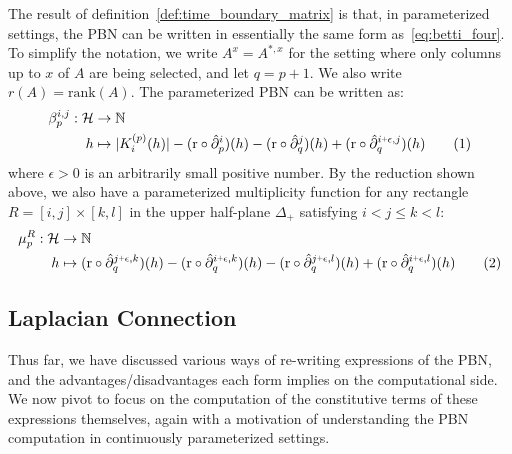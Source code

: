 \documentclass[10pt]{article}
\newcommand{\+}{%
	\raisebox{0.18ex}{\scaleobj{0.55}{+}}
}
\theoremstyle{definition}
\newcommand\numberthis{\addtocounter{equation}{1}\tag{\theequation}}
\begin{document}
\noindent
The result of definition~\ref{def:time_boundary_matrix} is that, in parameterized settings, the PBN can be written in essentially the same form as~\eqref{eq:betti_four}. To simplify the notation, we write $A^{x} = A^{\ast,x}$ for the setting where only columns up to $x$ of $A$ are being selected, and let $q = p + 1$. We also write $r(A) = \mathrm{rank}(A)$. The parameterized PBN can be written as: 
\begin{align*}\label{eq:pbn_parameterized}
	\beta_p^{i,j} : \mathcal{H} &\to \mathbb{N} \\
	h &\mapsto \lvert K_i^{(p)}(h) \rvert  -  (\mathrm{r} \circ \hat{\partial}_{p}^{i})(h) - (\mathrm{r} \circ \hat{\partial}_{q}^{j})(h) + (\mathrm{r} \circ \hat{\partial}_{q}^{i \+ \epsilon, j})(h) \numberthis
\end{align*}
where $\epsilon > 0$ is an arbitrarily small positive number. By the reduction shown above, we also have a parameterized multiplicity function for any rectangle $R = [i,j] \times [k,l]$ in the upper half-plane $\Delta_{+}$ satisfying $i < j \leq k < l$: 
\begin{align*}\label{eq:mu_parameterized}
	\mu_p^{R} : \mathcal{H} &\to \mathbb{N} \\
	h & \mapsto  (\mathrm{r} \circ \hat{\partial}_{q}^{j \+ \epsilon, k})(h) - (\mathrm{r} \circ \hat{\partial}_{q}^{i \+ \epsilon, k})(h) -  (\mathrm{r} \circ \hat{\partial}_{q}^{j \+ \epsilon, l})(h) + (\mathrm{r} \circ \hat{\partial}_{q}^{i \+ \epsilon, l})(h) \numberthis
\end{align*}




\subsection{Laplacian Connection}
Thus far, we have discussed various ways of re-writing expressions of the PBN, and the advantages/disadvantages each form implies on the computational side. We now pivot to focus on the computation of the constitutive terms of these expressions themselves, again with a motivation of understanding the PBN computation in continuously parameterized settings. 
\end{document}
